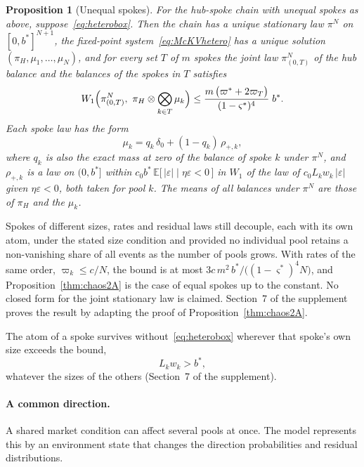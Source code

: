 \documentclass[11pt,a4paper]{article}
\theoremstyle{siphon}
\newtheorem{proposition}{Proposition}
\begin{document}
\begin{proposition}[Unequal spokes]\label{cor:hetero}
For the hub-spoke chain with unequal spokes as above, suppose~\eqref{eq:heterobox}. Then the chain has a unique stationary law $\pi^N$ on $[0, b^*]^{N+1}$, the fixed-point system~\eqref{eq:McKVhetero} has a unique solution $(\pi_H, \mu_1, \ldots, \mu_N)$, and for every set $T$ of $m$ spokes the joint law $\pi^N_{(0,T)}$ of the hub balance and the balances of the spokes in $T$ satisfies
\[
W_1\Bigl(\pi^N_{(0,T)},\ \pi_H \otimes \bigotimes_{k \in T} \mu_k\Bigr)  \leq  \frac{m\,\bigl(\varpi^* + 2 \varpi_T\bigr)}{(1 - \varsigma^*)^4}\;b^* .
\]
Each spoke law has the form
\[
\mu_k  =  q_k\,\delta_0 + (1 - q_k)\,\rho_{+,k} ,
\]
where $q_k$ is also the exact mass at zero of the balance of spoke $k$ under $\pi^N$, and $\rho_{+,k}$ is a law on $(0, b^*]$ within $c_0 b^*\,\mathbb{E}\bigl[\,|\varepsilon| \mid \eta \varepsilon < 0\,\bigr]$ in $W_1$ of the law of $c_0 L_k w_k\,|\varepsilon|$ given $\eta \varepsilon < 0$, both taken for pool $k$. The means of all balances under $\pi^N$ are those of $\pi_H$ and the $\mu_k$.
\end{proposition}

\noindent Spokes of different sizes, rates and residual laws still decouple, each with its own atom, under the stated size condition and provided no individual pool retains a non-vanishing share of all events as the number of pools grows. With rates of the same order, $\varpi_k \leq c/N$, the bound is at most $3 c\,m^2\,b^*/\bigl((1 - \varsigma^*)^4 N\bigr)$, and Proposition~\ref{thm:chaos2A} is the case of equal spokes up to the constant. No closed form for the joint stationary law is claimed. Section~7 of the supplement proves the result by adapting the proof of Proposition~\ref{thm:chaos2A}.

The atom of a spoke survives without~\eqref{eq:heterobox} wherever that spoke's own size exceeds the bound,
\begin{equation}\label{eq:heterocond}
L_k w_k  >  b^* ,
\end{equation}
whatever the sizes of the others (Section~7 of the supplement).

\paragraph{A common direction.}
A shared market condition can affect several pools at once. The model represents this by an environment state that changes the direction probabilities and residual distributions.
\end{document}
